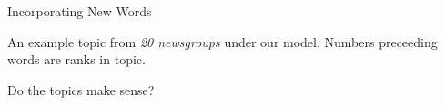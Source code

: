 \documentclass[xcolor=dvipsnames]{beamer}
\begin{document}
\begin{frame}{Incorporating New Words}
\begin{center}
\vspace{-5mm}
An example topic from \textit{20 newsgroups} under our model.
Numbers preceeding words are ranks in topic.
\end{center}

\end{frame}


\begin{frame}{Do the topics make sense?}

\centering

\end{frame}
\end{document}

